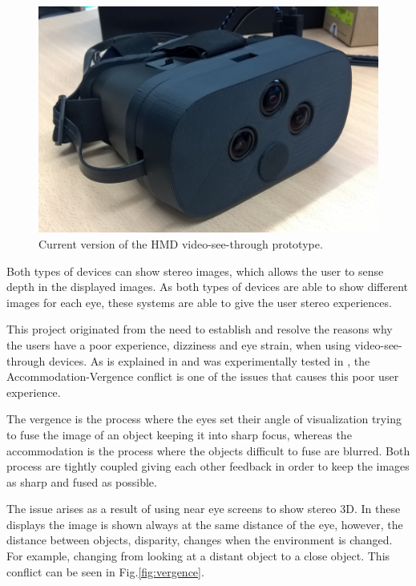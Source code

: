 \documentclass[10pt,a4paper,twocolumn,twoside]{article}
\begin{document}
	\begin{figure}
		\centering
		\includegraphics[width=1\linewidth]{img/imagenproto3.jpg}
		\caption{Current version of the HMD video-see-through prototype.}
		\label{fig:proto}
	\end{figure}
	
	Both types of devices can show stereo images, which allows the user to sense depth in the displayed images. 
	As both types of devices are able to show different images for each eye, these systems are able to give the user stereo experiences. 
	
	This project originated from the need to establish and resolve the reasons why the users have a poor experience, dizziness and eye strain, when using video-see-through devices. As is explained in \cite{disconfortReview} and was experimentally tested in \cite{vergenceDisconfort}, the Accommodation-Vergence conflict is one of the issues that causes this poor user experience.
	
	The vergence is the process where the eyes set their angle of visualization trying to fuse the image of an object keeping it into sharp focus, whereas the accommodation is the process where the objects difficult to fuse are blurred. Both process are tightly coupled giving each other feedback in order to keep the images as sharp and fused as possible. 
	
	The issue arises as a result of using near eye screens to show stereo 3D. In these displays the image is shown always at the same distance of the eye, however, the distance between objects, disparity,  changes when the environment is changed. For example, changing from looking at a distant object to a close object.  This conflict can be seen in Fig.\ref{fig:vergence}.
	
\end{document}
